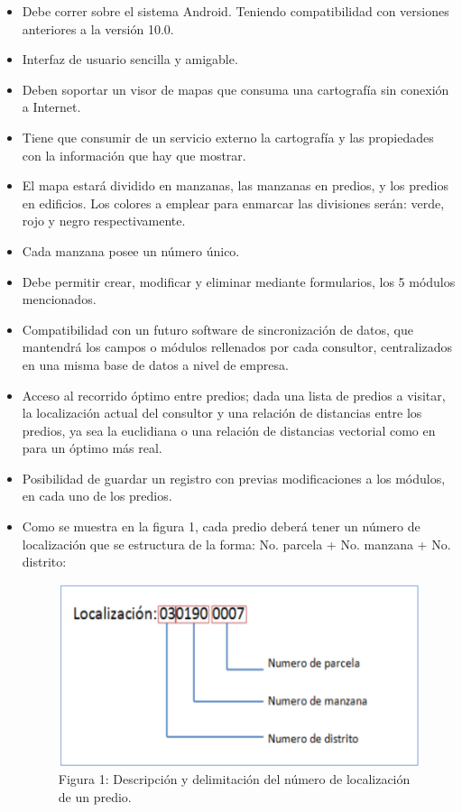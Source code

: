 \begin{itemize}
    \item Debe correr sobre el sistema Android. Teniendo compatibilidad con versiones
          anteriores a la versión 10.0.
    \item Interfaz de usuario sencilla y amigable.
    \item Deben soportar un visor de mapas que consuma una cartografía sin conexión
          a Internet.
    \item Tiene que consumir de un servicio externo la cartografía y las propiedades
          con la información que hay que mostrar.
    \item El mapa estará dividido en manzanas, las manzanas en predios, y los predios
          en edificios. Los colores a emplear para enmarcar las divisiones serán: verde,
          rojo y negro respectivamente.
    \item Cada manzana posee un número único.
    \item Debe permitir crear, modificar y eliminar mediante formularios, los 5 módulos
          mencionados.
    \item Compatibilidad con un futuro software de sincronización de datos, que
          mantendrá los campos o módulos rellenados por cada consultor,
          centralizados en una misma base de datos a nivel de empresa.
    \item Acceso al recorrido óptimo entre predios; dada una lista de predios a visitar,
          la localización actual del consultor y una relación de distancias entre los
          predios, ya sea la euclidiana o una relación de distancias vectorial como en
          para un óptimo más real.
    \item Posibilidad de guardar un registro con previas modificaciones a los módulos,
          en cada uno de los predios.
    \item Como se muestra en la figura 1, cada predio deberá tener un número de
          localización que se estructura de la forma: No. parcela + No. manzana + No.
          distrito:
          \begin{figure}[h]
              \centering
              \includegraphics[scale=0.5]{Graphics/1.png}
              \caption{Figura 1: Descripción y delimitación del número de localización de un predio.} %
              \label{fig:figura1}
          \end{figure}
\end{itemize}
